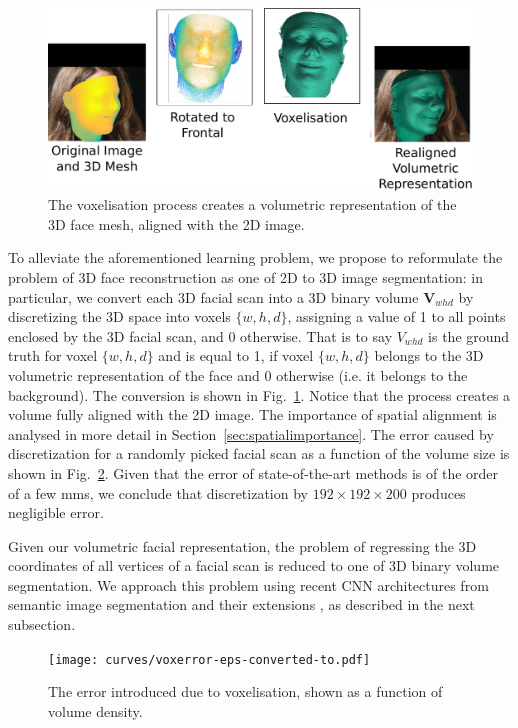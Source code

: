 \begin{figure}
  \centering
  \includegraphics[width=0.7\linewidth]{img/discretisation.pdf}
  \caption[Dataset voxelisation procedure]{The voxelisation process
    creates a volumetric representation of the 3D face mesh, aligned
    with the 2D image.}
  \label{fig:discretisation}
\end{figure}

To alleviate the aforementioned learning problem, we propose to
reformulate the problem of 3D face reconstruction as one of 2D to 3D
image segmentation: in particular, we convert each 3D facial scan into
a 3D binary volume $\mathbf{V}_{whd}$ by discretizing the 3D space
into voxels $\{w,h,d\}$, assigning a value of 1 to all
points enclosed by the 3D facial scan, and 0 otherwise. That is to say
$ V_{whd}$ is the ground truth for voxel $\{w,h,d\}$ and is equal to
1, if voxel $\{w,h,d\}$ belongs to the 3D volumetric representation of
the face and 0 otherwise (i.e. it belongs to the background). The
conversion is shown in Fig.~\ref{fig:discretisation}. Notice that the process creates a volume fully aligned with the 2D image. The importance of spatial alignment is analysed in more detail in Section~\ref{sec:spatialimportance}. The error caused by
discretization for a randomly picked facial scan as a function of the
volume size is shown in Fig.~\ref{fig:voxerror}. Given that the error of
state-of-the-art methods
\cite{roth2016adaptive,liu2016joint} is of the order of a few mms, we
conclude that discretization by $192\times 192\times 200$ produces negligible
error.

Given our volumetric facial representation, the problem of regressing
the 3D coordinates of all vertices of a facial scan is reduced to one
of 3D binary volume segmentation. We approach this problem using
recent CNN architectures from semantic image segmentation
\cite{long2015fully} and their extensions \cite{newell2016stacked}, as
described in the next subsection.

\begin{figure}
  \centering
\texttt{[image: curves/voxerror-eps-converted-to.pdf]}
\caption[Error due to voxelisation]{The error introduced due to
  voxelisation, shown as a function of volume density.}
\label{fig:voxerror}
\end{figure}

